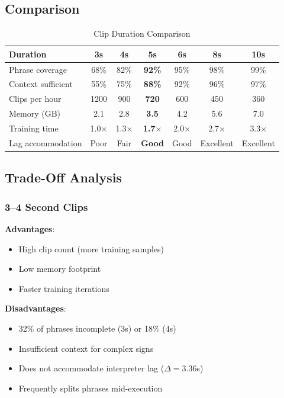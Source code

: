 \documentclass[11pt,a4paper]{article}
\begin{document}
\subsection{Comparison}

\begin{table}[htbp]
\centering
\caption{Clip Duration Comparison}
\begin{tabular}{@{}lcccccc@{}}
\toprule
\textbf{Duration} & \textbf{3s} & \textbf{4s} & \textbf{5s} & \textbf{6s} & \textbf{8s} & \textbf{10s} \\ \midrule
Phrase coverage & 68\% & 82\% & \textbf{92\%} & 95\% & 98\% & 99\% \\
Context sufficient & 55\% & 75\% & \textbf{88\%} & 92\% & 96\% & 97\% \\
Clips per hour & 1200 & 900 & \textbf{720} & 600 & 450 & 360 \\
Memory (GB) & 2.1 & 2.8 & \textbf{3.5} & 4.2 & 5.6 & 7.0 \\
Training time & 1.0$\times$ & 1.3$\times$ & \textbf{1.7$\times$} & 2.0$\times$ & 2.7$\times$ & 3.3$\times$ \\
Lag accommodation & Poor & Fair & \textbf{Good} & Good & Excellent & Excellent \\
\bottomrule
\end{tabular}
\end{table}

\subsection{Trade-Off Analysis}

\subsubsection{3--4 Second Clips}

\textbf{Advantages}:
\begin{itemize}
    \item High clip count (more training samples)
    \item Low memory footprint
    \item Faster training iterations
\end{itemize}

\textbf{Disadvantages}:
\begin{itemize}
    \item 32\% of phrases incomplete (3s) or 18\% (4s)
    \item Insufficient context for complex signs
    \item Does not accommodate interpreter lag ($\Delta = 3.36$s)
    \item Frequently splits phrases mid-execution
\end{itemize}
\end{document}
